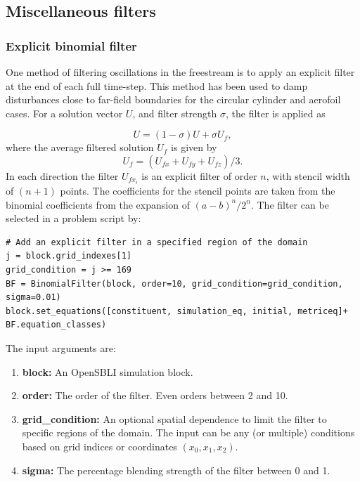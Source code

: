 \documentclass[11pt]{article}
\begin{document}
\subsection{Miscellaneous filters}
\subsubsection{Explicit binomial filter}
One method of filtering oscillations in the freestream is to apply an explicit filter at the end of each full time-step. This method has been used to damp disturbances close to far-field boundaries for the circular cylinder and aerofoil cases. For a solution vector $U$, and filter strength $\sigma$, the filter is applied as

\begin{equation}
U = (1-\sigma)U + \sigma U_f,
\end{equation}
where the average filtered solution $U_f$ is given by
\begin{equation}
U_{f} = (U_{fx} + U_{fy} + U_{fz})/3.
\end{equation}
In each direction the filter $U_{fx_{i}}$ is an explicit filter of order $n$, with stencil width of $\left(n+1\right)$ points. The coefficients for the stencil points are taken from the binomial coefficients from the expansion of $(a-b)^n / 2^n$. The filter can be selected in a problem script by:

\begin{lstlisting}
# Add an explicit filter in a specified region of the domain
j = block.grid_indexes[1]
grid_condition = j >= 169
BF = BinomialFilter(block, order=10, grid_condition=grid_condition, sigma=0.01)
block.set_equations([constituent, simulation_eq, initial, metriceq]+ BF.equation_classes)
\end{lstlisting}
The input arguments are:
\begin{enumerate}
\item{\textbf{block:} An OpenSBLI simulation block.}
\item{\textbf{order:} The order of the filter. Even orders between 2 and 10.}
\item{\textbf{grid\_condition:} An optional spatial dependence to limit the filter to specific regions of the domain. The input can be any (or multiple) conditions based on grid indices or coordinates $\left(x_0, x_1, x_2\right)$.}
\item{\textbf{sigma:} The percentage blending strength of the filter between 0 and 1.}
\end{enumerate}
\end{document}
